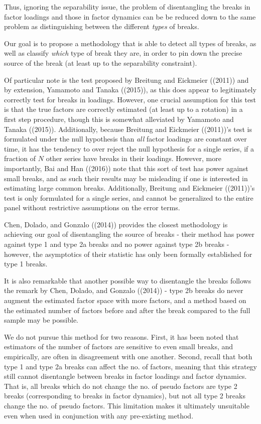 \documentclass[
]{article}
\begin{document}
Thus, ignoring the separability issue, the problem of disentangling the
breaks in factor loadings and those in factor dynamics can be be reduced
down to the same problem as distinguishing between the different
\emph{types} of breaks.

Our goal is to propose a methodology that is able to detect all types of
breaks, as well as classify \emph{which} type of break they are, in
order to pin down the precise source of the break (at least up to the
separability constraint).

Of particular note is the test proposed by Breitung and Eickmeier
((2011)) and by extension, Yamamoto and Tanaka ((2015)), as this does
appear to legitimately correctly test for breaks in loadings. However,
one crucial assumption for this test is that the true factors are
correctly estimated (at least up to a rotation) in a first step
procedure, though this is somewhat alleviated by Yamamoto and Tanaka
((2015)). Additionally, because Breitung and Eickmeier ((2011))'s test
is formulated under the null hypothesis than \emph{all} factor loadings
are constant over time, it has the tendency to over reject the null
hypothesis for a single series, if a fraction of \(N\) other series have
breaks in their loadings. However, more importantly, Bai and Han
((2016)) note that this sort of test has power against small breaks, and
as such their results may be misleading if one is interested in
estimating large common breaks. Additionally, Breitung and Eickmeier
((2011))'s test is only formulated for a single series, and cannot be
generalized to the entire panel without restrictive assumptions on the
error terms.

Chen, Dolado, and Gonzalo ((2014)) provides the closest methodology is
achieving our goal of disentangling the source of breaks - their method
has power against type 1 and type 2a breaks and no power against type 2b
breaks - however, the asymptotics of their statistic has only been
formally established for type 1 breaks.

It is also remarkable that another possible way to disentangle the
breaks follows the remark by Chen, Dolado, and Gonzalo ((2014)) - type
2b breaks do never augment the estimated factor space with more factors,
and a method based on the estimated number of factors before and after
the break compared to the full sample may be possible.

We do not pursue this method for two reasons. First, it has been noted
that estimators of the number of factors are sensitive to even small
breaks, and empirically, are often in disagreement with one another.
Second, recall that both type 1 and type 2a breaks can affect the no. of
factors, meaning that this strategy still cannot disentangle between
breaks in factor loadings and factor dynamics. That is, all breaks which
do not change the no. of pseudo factors are type 2 breaks (corresponding
to breaks in factor dynamics), but not all type 2 breaks change the no.
of pseudo factors. This limitation makes it ultimately unsuitable even
when used in conjunction with any pre-existing method.
\end{document}
